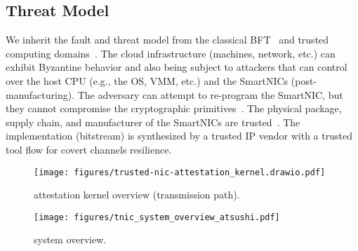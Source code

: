 \subsection{Threat Model} 


We inherit the fault and threat model from the classical BFT~\cite{Castro:2002} and trusted computing domains~\cite{intel-sgx}. The cloud infrastructure (machines, network, etc.) can exhibit Byzantine behavior and also being subject to attackers that can control over the host CPU (e.g., the OS, VMM, etc.) and the SmartNICs (post-manufacturing). The adversary can attempt to re-program the SmartNIC, but they cannot compromise the cryptographic primitives~\cite{levin2009trinc, minBFT, Castro:2002}. The physical package, supply chain, and manufacturer of the SmartNICs are trusted~\cite{10.1145/3503222.3507733, 10.1145/2168836.2168866}. The \projecttitle{} implementation (bitstream) is synthesized by a trusted IP vendor with a trusted tool flow for covert channels resilience. %



\begin{figure}[t!]
    \centering
    \texttt{[image: figures/trusted-nic-attestation\_kernel.drawio.pdf]}
    \caption{\trustedfpga{} attestation kernel overview (transmission path).}
    \label{fig:attestation_kernel}
\end{figure}    
\fi

\begin{figure}[t!]
    \centering
    \texttt{[image: figures/tnic\_system\_overview\_atsushi.pdf]}
    \caption{\projecttitle{} system overview.}
    \label{fig:overview}
\end{figure}


